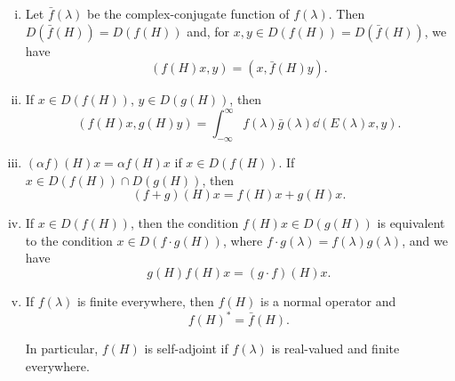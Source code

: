 \begin{theorem}\label{thm:XI.12.Theorem.3} \begin{enumerate}[(i)]
\item Let $\bar{f}(\lambda)$ be the complex-conjugate function of $f(\lambda)$. Then $D(\bar{f}(H)) = D(f(H))$ and, for $x, y \in D(f(H)) = D(\bar{f}(H))$, we have 
\begin{equation}\label{eq:XI.12.17}
(f (H) x, y) = (x, \bar {f} (H) y).
\end{equation}
\item If $x \in D(f(H))$, $y \in D(g(H))$, then 
\begin{equation}\label{eq:XI.12.18}
(f (H) x, g (H) y) = \int_{- \infty} ^{\infty} f (\lambda) \bar {g} (\lambda) \dd (E (\lambda) x, y).
\end{equation}
\item $(\alpha f)(H)x = \alpha f(H)x$ if $x\in D(f(H))$. If $x\in D(f(H))\cap D(g(H))$, then 
\begin{equation}\label{eq:XI.12.19}
(f + g) (H) x = f (H) x + g (H) x.
\end{equation}
\item If $x \in D(f(H))$, then the condition $f(H)x \in D(g(H))$ is equivalent to the condition $x \in D(f \cdot g(H))$, where $f \cdot g(\lambda) = f(\lambda)g(\lambda)$, and we have 
\begin{equation}\label{eq:XI.12.20}
g (H) f (H) x = (g \cdot f) (H) x.
\end{equation}
\item If $f(\lambda)$ is finite everywhere, then $f(H)$ is a normal operator and 
\begin{equation}\label{eq:XI.12.21}
f (H) ^{*} = \bar {f} (H).
\end{equation}

In particular, $f(H)$ is self-adjoint if $f(\lambda)$ is real-valued and finite everywhere.
\end{enumerate}
\end{theorem}

